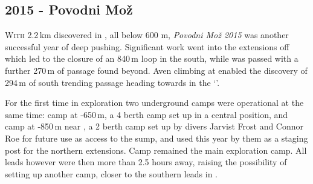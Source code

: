 \newpage
\begin{tcolorbox}
\chapter{2015 - Povodni Mo\v{z}}
		\lettrine{W}{ith} 2.2\,km discovered in , all below 600 m, \emph{Povodni Mo\v{z} 2015} was another successful year of deep pushing. Significant work went into the extensions off  which led to the closure of an 840\,m loop in the south, while  was passed with a further 270\,m of passage found beyond. Aven climbing at  enabled the discovery of 294\,m of south trending passage heading towards  in the `'. 

		For the first time in  exploration two underground camps were operational at the same time: camp  at -650\,m, a 4 berth camp set up in a central position, and camp at -850\,m near , a 2 berth camp set up by divers Jarvist Frost and Connor Roe for future use as access to the  sump, and used this year by them as a staging post for the northern extensions. Camp  remained the main exploration camp. All leads however were then more than 2.5 hours away, raising the possibility of setting up another camp, closer to the southern leads in .
	

\end{tcolorbox}
\BgThispage



